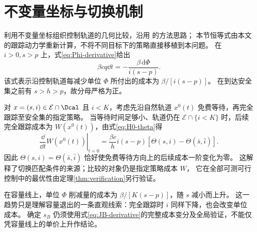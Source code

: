 \section{不变量坐标与切换机制}
\label{sec:switching-mechanism}
利用不变量坐标组织控制轨道的几何比较，沿用 \citet{Angulo2021} 的方法思路；
本节恒等式由本文的跟踪动力学重新计算，不将不同目标下的策略直接移植到本问题。
在 $i>0,s>p$ 上，式\eqref{eq:Phi-derivative}给出
\begin{equation}
 \beta cq\dd t=-\frac{\beta\,\mathrm d\Phi}{i(s-p)}.
 \label{eq:cost-in-Phi}
\end{equation}
该式表示沿控制轨道每减少单位 $\Phi$ 所付出的成本为 $\beta/[i(s-p)]$。
在到达安全集之前有 $s>h>p$，故分母严格为正。

对 $x=(s,i)\in\mathcal E\cap\Dcal$ 且 $i<K$，考虑先沿自然轨道 $x^0(t)$ 免费等待，再完全跟踪至安全集的指定策略。
当等待时间足够小、轨道仍在 $\mathcal E\cap\{i<K\}$ 时，后续完全跟踪成本为 $W(x^0(t))$，由式\eqref{eq:H0-theta}得
\begin{equation}
 \left.\frac{\dd}{\dd t}W(x^0(t))\right|_{t=0}
 =\frac{\beta c}{h}i(s-p)
   [\Theta(s,i)-\Theta(\bar s,\bar i)].
 \label{eq:waiting-marginal-cost}
\end{equation}
因此 $\Theta(s,i)=\Theta(\bar s,\bar i)$ 恰好使免费等待方向上的后续成本一阶变化为零。
这解释了切换匹配条件的来源；比较的对象仍是指定策略成本 $W$，
它在全部可测可行控制中的最优性由定理\ref{thm:verification}另行验证。

在容量线上，单位 $\Phi$ 削减量的成本为 $\beta/[K(s-p)]$，随 $s$ 减小而上升。
这一趋势只是理解容量退出的一条直观线索：完全跟踪时 $i$ 同样下降，也会改变单位成本。
确定 $s_B$ 仍须使用式\eqref{eq:JB-derivative}的完整成本变分及全局验证，不能仅凭容量线上的单价上升作结论。
